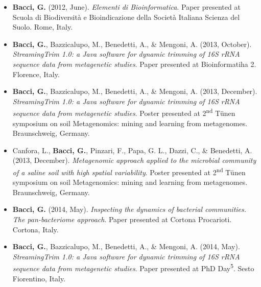 \begin{itemize}

\item \textbf{Bacci, G.} (2012, June). \textit{Elementi di Bioinformatica}. Paper presented at Scuola di Biodiversità e Bioindicazione della Società Italiana Scienza del Suolo. Rome, Italy.

\item \textbf{Bacci, G.}, Bazzicalupo, M., Benedetti, A., \& Mengoni, A. (2013, October). \textit{StreamingTrim 1.0: a Java software for dynamic trimming of 16S rRNA sequence data from metagenetic studies}. Paper presented at Bioinformatiha 2. Florence, Italy.

\item \textbf{Bacci, G.}, Bazzicalupo, M., Benedetti, A., \& Mengoni, A. (2013, December). \textit{StreamingTrim 1.0: a Java software for dynamic trimming of 16S rRNA sequence data from metagenetic studies}. Poster presented at 2\textsuperscript{nd} T\"{u}nen symposium on soil Metagenomics: mining and learning from metagenomes. Braunschweig, Germany.

\item Canfora, L., \textbf{Bacci, G.}, Pinzari, F., Papa, G. L., Dazzi, C., \& Benedetti, A. (2013, December). \textit{Metagenomic approach applied to the microbial community of a saline soil with high spatial variability}. Poster presented at 2\textsuperscript{nd} T\"{u}nen symposium on soil Metagenomics: mining and learning from metagenomes. Braunschweig, Germany.

\item \textbf{Bacci, G.} (2014, May). \textit{Inspecting the dynamics of bacterial communities. The pan-bacteriome approach}. Paper presented at Cortona Procarioti. Cortona, Italy.

\item \textbf{Bacci, G.}, Bazzicalupo, M., Benedetti, A., \& Mengoni, A. (2014, May). \textit{StreamingTrim 1.0: a Java software for dynamic trimming of 16S rRNA sequence data from metagenetic studies}. Paper presented at PhD Day\textsuperscript{5}. Sesto Fiorentino, Italy.

\end{itemize}

